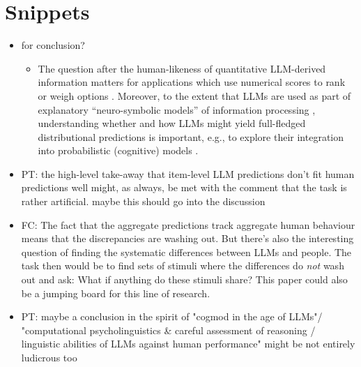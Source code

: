 \documentclass[fleqn]{article}
\begin{document}
\section*{Snippets}

\begin{itemize}
  \item for conclusion?
  \begin{itemize}
    \item The question after the human-likeness of quantitative LLM-derived information matters for applications which use numerical scores to rank or weigh options \citep[e.g.,][]{ParkOBrien2023:Generative-Agen,ZhangLehman2023:OMNI:-Open-ende}.
    Moreover, to the extent that LLMs are used as part of explanatory ``neuro-symbolic models'' of information processing \citep{GarcezLamb2020:Neurosymbolic-A}, understanding whether and how LLMs might yield full-fledged distributional predictions is important, e.g., to explore their integration into probabilistic (cognitive) models \citep[c.f.,][]{Frank2023:Large-language-}.
  \end{itemize}
  \item PT: the high-level take-away that item-level LLM predictions don't fit human predictions well might, as always, be met with the comment that the task is rather artificial. maybe this should go into the discussion
  \item FC: The fact that the aggregate predictions track aggregate human behaviour means that the discrepancies are washing out. But there's also the interesting question of finding the systematic differences between LLMs and people. The task then would be to find sets of stimuli where the differences do \emph{not} wash out and ask: What if anything do these stimuli share? This paper could also be a jumping board for this line of research.
  \item PT: maybe a conclusion in the spirit of "cogmod in the age of LLMs"/ "computational psycholinguistics \& careful assessment of reasoning / linguistic abilities of LLMs against human performance" might be not entirely ludicrous too
\end{itemize}
\end{document}
